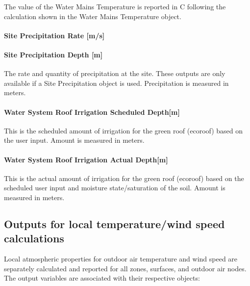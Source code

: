 The value of the Water Mains Temperature is reported in C following the calculation shown in the Water Mains Temperature object.

\paragraph{Site Precipitation Rate {[}m/s{]}}\label{site-precipitation-rate-ms}

\paragraph{Site Precipitation Depth {[}m{]}}\label{site-precipitation-depth-m-1}

The rate and quantity of precipitation at the site. These outputs are only available if a Site Precipitation object is used. Precipitation is measured in meters.

\paragraph{Water System Roof Irrigation Scheduled Depth{[}m{]}}\label{water-system-roof-irrigation-scheduled-depthm}

This is the scheduled amount of irrigation for the green roof (ecoroof) based on the user input. Amount is measured in meters.

\paragraph{Water System Roof Irrigation Actual Depth{[}m{]}}\label{water-system-roof-irrigation-actual-depthm}

This is the actual amount of irrigation for the green roof (ecoroof) based on the scheduled user input and moisture state/saturation of the soil. Amount is measured in meters.

\subsection{Outputs for local temperature/wind speed calculations}\label{outputs-for-local-temperaturewind-speed-calculations}

Local atmospheric properties for outdoor air temperature and wind speed are separately calculated and reported for all zones, surfaces, and outdoor air nodes. The output variables are associated with their respective objects:

